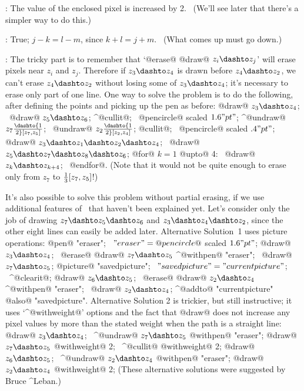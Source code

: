 :
 The value of the enclosed pixel is increased by 2. \ (We'll see later
that there's a simpler way to do this.)

:
 True; $j-k=l-m$, since $k+l=j+m$. \ (What comes up must go down.)

:
 The tricky part is to remember that `@erase@ @draw@ $z_i\dashto z_j$'
will erase pixels near $z_i$ and $z_j$. Therefore if $z_3\dashto z_4$ is
drawn before $z_4\dashto z_2$, we can't erase $z_4\dashto z_2$ without losing
some of $z_3\dashto z_4$; it's necessary to erase only part of one line.
One way to solve the problem is to do the following, after defining the
points and picking up the pen as before:
\begindisplay
@draw@ $z_3\dashto z_4$; \ @draw@ $z_5\dashto z_6$;\cr
^@cullit@; \ \pickup @pencircle@ scaled $1.6"pt"$;\cr
^@undraw@ $z_7\dashto {1\over2}[z_7,z_5]$; \
 @undraw@ $z_2\dashto {1\over2}[z_2,z_4]$;\cr
@cullit@; \ \pickup @pencircle@ scaled $.4"pt"$;\cr
@draw@ $z_3\dashto z_1\dashto z_2\dashto z_4$; \
 @draw@ $z_5\dashto z_7\dashto z_8\dashto z_6$;\cr
@for@ $k=1$ @upto@ 4: \ @draw@ $z_k\dashto z_{k+4}$; \ @endfor@.\cr
\enddisplay
(Note that it would not be quite enough to erase only from $z_7$ to
${1\over3}[z_7,z_5]$!)\par
It's also possible to solve this problem without partial erasing, if we
use additional features of \MF\ that haven't been explained yet. Let's
consider only the job of drawing $z_7\dashto z_5\dashto z_6$ and
$z_3\dashto z_4\dashto z_2$, since the other eight lines can easily be
added later. Alternative Solution~1 uses picture operations:
\begindisplay
@pen@ "eraser"; \ $"eraser"=@pencircle@$ scaled $1.6"pt"$;\cr
@draw@ $z_3\dashto z_4$; \
@erase@ @draw@ $z_7\dashto z_5$ ^@withpen@ "eraser"; \
@draw@ $z_7\dashto z_5$;\cr
@picture@ "savedpicture"; \ $"savedpicture"="currentpicture"$; \ ^@clearit@;\cr
@draw@ $z_6\dashto z_5$; \
@erase@ @draw@ $z_2\dashto z_4$ ^@withpen@ "eraser"; \
@draw@ $z_2\dashto z_4$;\cr
^@addto@ "currentpicture" @also@ "savedpicture".\cr
\enddisplay
Alternative Solution 2 is trickier, but still instructive; it uses
`^@withweight@' options and the fact that @draw@ does not increase any
pixel values by more than the stated weight when the path is a straight
line:
\begindisplay
@draw@ $z_3\dashto z_4$; \
^@undraw@ $z_7\dashto z_5$ @withpen@ "eraser";\cr
@draw@ $z_7\dashto z_5$ @withweight@ 2; \
^@cullit@ @withweight@ 2;\cr
@draw@ $z_6\dashto z_5$; \
^@undraw@ $z_2\dashto z_4$ @withpen@ "eraser";\cr
@draw@ $z_2\dashto z_4$ @withweight@ 2;\cr
\enddisplay
(These alternative solutions were suggested by Bruce ^{Leban}.)

